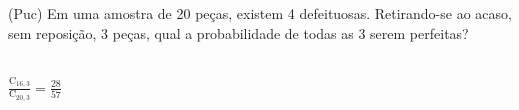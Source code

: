 \begin{ex}
(Puc) Em uma amostra de 20 peças, existem 4 defeituosas. Retirando-se ao acaso, sem reposição, 3 peças, qual a probabilidade de todas as 3 serem perfeitas?
  \begin{sol}
    \phantom{A} \\
    $\frac{\mathrm{C}_{{16},3}}{\mathrm{C}_{{20},3}}=\frac{28}{57}$
  \end{sol}
\end{ex}